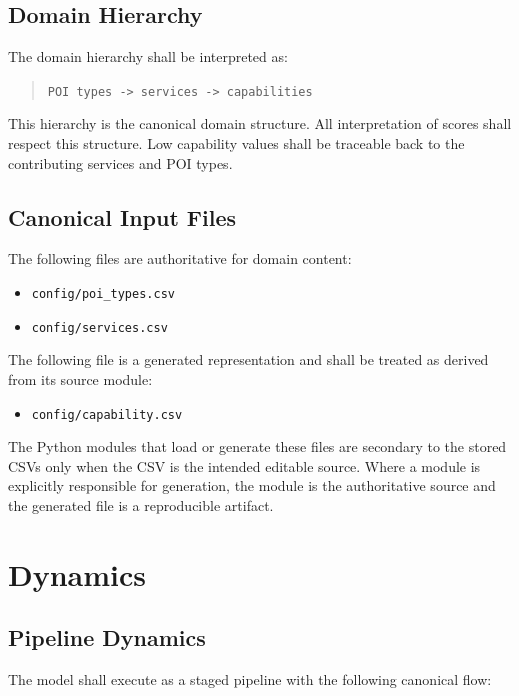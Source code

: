 \documentclass[11pt]{article}
\begin{document}
\subsection*{Domain Hierarchy}

The domain hierarchy shall be interpreted as:

\begin{quote}
\texttt{POI types -> services -> capabilities}
\end{quote}

This hierarchy is the canonical domain structure. All interpretation of scores shall respect this structure. Low capability values shall be traceable back to the contributing services and POI types.

\subsection*{Canonical Input Files}

The following files are authoritative for domain content:

\begin{itemize}
  \item \texttt{config/poi\_types.csv}
  \item \texttt{config/services.csv}
\end{itemize}

The following file is a generated representation and shall be treated as derived from its source module:

\begin{itemize}
  \item \texttt{config/capability.csv}
\end{itemize}

The Python modules that load or generate these files are secondary to the stored CSVs only when the CSV is the intended editable source. Where a module is explicitly responsible for generation, the module is the authoritative source and the generated file is a reproducible artifact.

\section{Dynamics}

\subsection*{Pipeline Dynamics}

The model shall execute as a staged pipeline with the following canonical flow:
\end{document}
